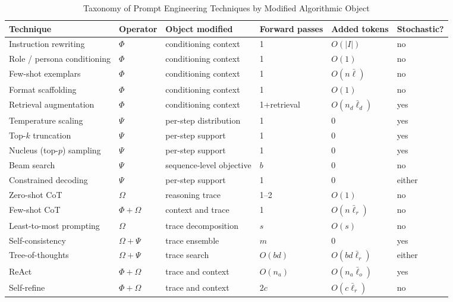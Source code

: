 \documentclass{article}
\begin{document}
\begin{table}[h]
\centering
\caption{Taxonomy of Prompt Engineering Techniques by Modified Algorithmic Object}
\begin{tabular}{llllll}
\toprule
\textbf{Technique} & \textbf{Operator} & \textbf{Object modified} & \textbf{Forward passes} & \textbf{Added tokens} & \textbf{Stochastic?} \\
\midrule
Instruction rewriting & $\Phi$ & conditioning context & 1 & $O(|I|)$ & no \\
Role / persona conditioning & $\Phi$ & conditioning context & 1 & $O(1)$ & no \\
Few-shot exemplars & $\Phi$ & conditioning context & 1 & $O(n\bar{\ell})$ & no \\
Format scaffolding & $\Phi$ & conditioning context & 1 & $O(1)$ & no \\
Retrieval augmentation & $\Phi$ & conditioning context & 1+retrieval & $O(n_d\bar{\ell}_d)$ & yes \\
\midrule
Temperature scaling & $\Psi$ & per-step distribution & 1 & 0 & yes \\
Top-$k$ truncation & $\Psi$ & per-step support & 1 & 0 & yes \\
Nucleus (top-$p$) sampling & $\Psi$ & per-step support & 1 & 0 & yes \\
Beam search & $\Psi$ & sequence-level objective & $b$ & 0 & no \\
Constrained decoding & $\Psi$ & per-step support & 1 & 0 & either \\
\midrule
Zero-shot CoT & $\Omega$ & reasoning trace & 1–2 & $O(1)$ & no \\
Few-shot CoT & $\Phi + \Omega$ & context and trace & 1 & $O(n\bar{\ell}_r)$ & no \\
Least-to-most prompting & $\Omega$ & trace decomposition & $s$ & $O(s)$ & no \\
Self-consistency & $\Omega + \Psi$ & trace ensemble & $m$ & 0 & yes \\
Tree-of-thoughts & $\Omega + \Psi$ & trace search & $O(bd)$ & $O(bd\bar{\ell}_r)$ & either \\
ReAct & $\Phi + \Omega$ & trace and context & $O(n_a)$ & $O(n_a\bar{\ell}_o)$ & yes \\
Self-refine & $\Phi + \Omega$ & trace and context & $2c$ & $O(c\bar{\ell}_r)$ & no \\
\bottomrule
\end{tabular}
\end{table}
\end{document}
